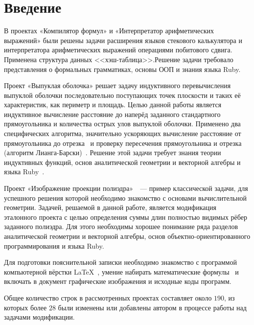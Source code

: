 \section{Введение}

В проектах «Компилятор формул» и «Интерпретатор арифметических
выражений» были решены задачи расширения языков стекового калькулятора
и интерпретатора арифметических выражений операциями побитового сдвига.
Применена структура данных <<хэш-таблица>>.Решение задачи требовало представления
о формальных грамматиках, основы ООП и знания языка Ruby.

Проект «Выпуклая оболочка»\cite{convex} решает задачу индуктивного перевычисления выпуклой оболочки последовательно поступающих точек плоскости и таких её характеристик, как периметр и площадь. Целью данной работы является
индуктивное вычисление расстояние до наперёд заданного стандартного прямоугольника
и количества острых улов выпуклой оболочки. Применено два специфических алгоритма,
значительно ускоряющих вычисление расстояние от прямоугольника до
отрезка~\cite{seginters} и проверку пересечения прямоугольника и
отрезка (алгоритм Лианга-Барски)~\cite{barsky}. Решение этой задачи требует знания
теории индуктивных функций, основ аналитической геометрии и векторной алгебры
и языка Ruby~\cite{ruby}.

Проект «Изображение проекции полиэдра»~\cite{polyedr}~--- пример
классической задачи, для успешного решения которой необходимо знакомство с
основами вычислительной геометрии. Задачей, решаемой в данной работе, является
модификация эталонного проекта с целью определения суммы длин полностью видимых
рёбер заданного полиэдра. Для этого необходимы хорошее понимание ряда разделов
аналитической геометрии и векторной алгебры, основ объектно-ориентированного
программирования и языка Ruby.

Для подготовки пояснительной записки необходимо знакомство с программой компьютерной вёрстки \LaTeX~\cite{rlatex}, умение набирать математические формулы~\cite{texbook} и включать в документ графические изображения и исходные
коды программ.

Общее количество строк в рассмотренных проектах составляет около $190$, из которых более $28$ были изменены или добавлены автором в процессе работы над задачами модификации.
